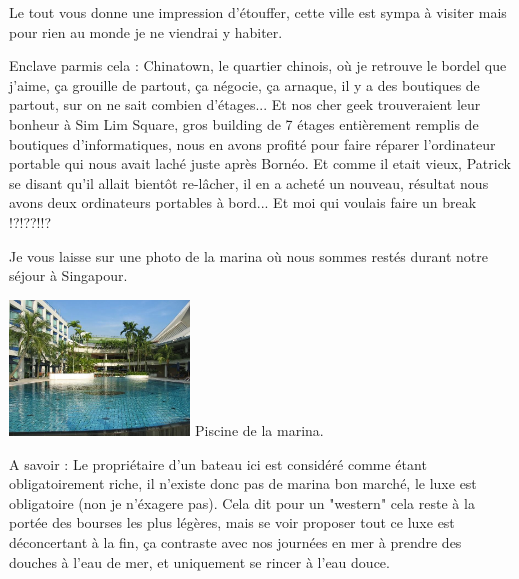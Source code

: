 \begin{multicols}{2}
Le tout vous donne une impression d'étouffer, cette ville est sympa à visiter mais pour rien au monde je ne viendrai y habiter.

Enclave parmis cela : Chinatown, le quartier chinois, où je retrouve le bordel que j'aime, ça grouille de partout, ça négocie, ça arnaque, il y a des boutiques de partout, sur on ne sait combien d'étages... Et nos cher geek trouveraient leur bonheur à Sim Lim Square, gros building de 7 étages entièrement remplis de boutiques d'informatiques, nous en avons profité pour faire réparer l'ordinateur portable qui nous avait laché juste après Bornéo. Et comme il etait vieux, Patrick se disant qu'il allait bientôt re-lâcher, il en a acheté un nouveau, résultat nous avons deux ordinateurs portables à bord... Et moi qui voulais faire un break !?!??!!?

Je vous laisse sur une photo de la marina où nous sommes restés durant notre séjour à Singapour.

\hspace*{-0.65cm}
\includegraphics[width=4.8cm]{articles/Singapour-ville-pays/1210345462qOEk.jpg}
Piscine de la marina.

A savoir : Le propriétaire d'un bateau ici est considéré comme étant obligatoirement riche, il n'existe donc pas de marina bon marché, le luxe est obligatoire (non je n'éxagere pas). Cela dit pour un "western" cela reste à la portée des bourses les plus légères, mais se voir proposer tout ce luxe est déconcertant à la fin, ça contraste avec nos journées en mer à prendre des douches à l'eau de mer, et uniquement se rincer à l'eau douce.

\end{multicols}


